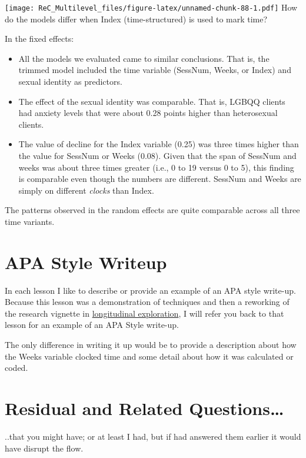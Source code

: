 \documentclass[
  11pt,
]{book}
\providecommand{\tightlist}{%
  \setlength{\itemsep}{0pt}\setlength{\parskip}{0pt}}
\begin{document}
\texttt{[image: ReC\_Multilevel\_files/figure-latex/unnamed-chunk-88-1.pdf]}
How do the models differ when Index (time-structured) is used to mark time?

In the fixed effects:

\begin{itemize}
\tightlist
\item
  All the models we evaluated came to similar conclusions. That is, the trimmed model included the time variable (SessNum, Weeks, or Index) and sexual identity as predictors.
\item
  The effect of the sexual identity was comparable. That is, LGBQQ clients had anxiety levels that were about 0.28 points higher than heterosexual clients.
\item
  The value of decline for the Index variable (0.25) was three times higher than the value for SessNum or Weeks (0.08). Given that the span of SessNum and weeks was about three times greater (i.e., 0 to 19 versus 0 to 5), this finding is comparable even though the numbers are different. SessNum and Weeks are simply on different \emph{clocks} than Index.
\end{itemize}

The patterns observed in the random effects are quite comparable across all three time variants.

\hypertarget{apa-style-writeup-3}{%
\section{APA Style Writeup}\label{apa-style-writeup-3}}

In each lesson I like to describe or provide an example of an APA style write-up. Because this lesson was a demonstration of techniques and then a reworking of the research vignette in \href{MLMexplore}{longitudinal exploration}, I will refer you back to that lesson for an example of an APA Style write-up.

The only difference in writing it up would be to provide a description about how the Weeks variable clocked time and some detail about how it was calculated or coded.

\hypertarget{residual-and-related-questions-3}{%
\section{Residual and Related Questions\ldots{}}\label{residual-and-related-questions-3}}

..that you might have; or at least I had, but if had answered them earlier it would have disrupt the flow.
\end{document}

